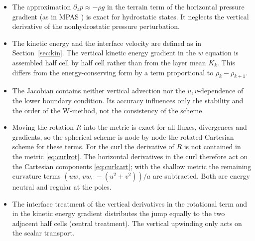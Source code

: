 \documentclass[11pt,a4paper]{article}
\begin{document}
\begin{itemize}
\item The approximation $\partial_z p \approx -\rho g$ in the terrain term of
  the horizontal pressure gradient (as in MPAS \cite{KlempSkamarock2021}) is
  exact for hydrostatic states. It neglects the vertical derivative of the
  nonhydrostatic pressure perturbation.
\item The kinetic energy and the interface velocity are defined as in
  Section~\ref{sec:kin}. The vertical kinetic energy gradient in the $w$
  equation is assembled half cell by half cell rather than from the layer
  mean $K_k$. This differs from the energy-conserving form by a term
  proportional to $\rho_k - \rho_{k+1}$.
\item The Jacobian contains neither vertical advection nor the
  $u,v$-dependence of the lower boundary condition. Its accuracy influences
  only the stability and the order of the W-method, not the consistency of
  the scheme.
\item Moving the rotation $R$ into the metric is exact for all fluxes,
  divergences and gradients, so the spherical scheme is node by node the
  rotated Cartesian scheme for these terms. For the curl the derivative of
  $R$ is not contained in the metric \eqref{eq:curlrot}. The horizontal
  derivatives in the curl therefore act on the Cartesian components
  \eqref{eq:curlcart}; with the shallow metric the remaining curvature
  terms $(uw,\,vw,\,-(u^2+v^2))/a$ are subtracted. Both are energy neutral
  and regular at the poles.
\item The interface treatment of the vertical derivatives in the rotational
  term and in the kinetic energy gradient distributes the jump equally to the
  two adjacent half cells (central treatment). The vertical upwinding only
  acts on the scalar transport.
\end{itemize}
\end{document}
